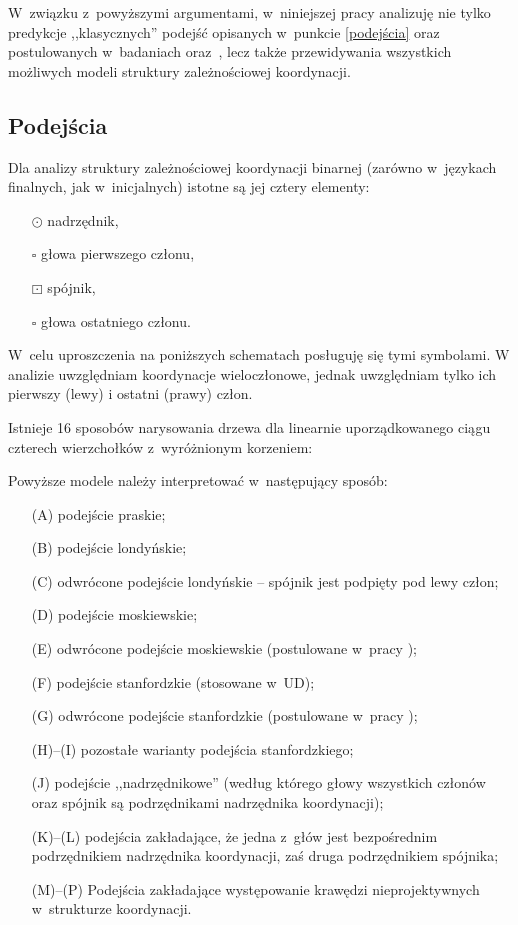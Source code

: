 W~związku z~powyższymi argumentami, w~niniejszej pracy analizuję nie tylko predykcje ,,klasycznych'' podejść opisanych w~punkcie \ref{podejścia} oraz postulowanych w~badaniach \cite{kanayama2018coordinate} oraz~\cite{choi2011statistical}, lecz także przewidywania wszystkich możliwych modeli struktury zależnościowej koordynacji.

\subsection{Podejścia} \label{wszystkie-podejścia}

Dla analizy struktury zależnościowej koordynacji binarnej (zarówno w~językach finalnych, jak w~inicjalnych) istotne są jej cztery elementy: 
\begin{itemize}
\item[$\odot$] nadrzędnik, 
\item[$\square$] głowa pierwszego członu,
\item[$\boxdot$] spójnik, 
\item[$\square$] głowa ostatniego członu. 
\end{itemize}
W~celu uproszczenia na poniższych schematach posługuję się tymi symbolami. W analizie uwzględniam koordynacje wieloczłonowe, jednak uwzględniam tylko ich pierwszy (lewy) i ostatni (prawy) człon.

Istnieje 16 sposobów narysowania drzewa dla linearnie uporządkowanego ciągu czterech wierzchołków z~wyróżnionym korzeniem:



Powyższe modele należy interpretować w~następujący sposób:
\begin{enumerate}
\item[(A)] podejście praskie;
\item[(B)] podejście londyńskie;
\item[(C)] odwrócone podejście londyńskie -- spójnik jest podpięty pod lewy człon;
\item[(D)] podejście moskiewskie;
\item[(E)] odwrócone podejście moskiewskie (postulowane w~pracy \citealp{choi2011statistical});
\item[(F)] podejście stanfordzkie (stosowane w~UD);
\item[(G)] odwrócone podejście stanfordzkie (postulowane w~pracy \citealp{kanayama2018coordinate});
\item[(H)--(I)] pozostałe warianty podejścia stanfordzkiego;
\item[(J)] podejście ,,nadrzędnikowe'' (według którego głowy wszystkich członów oraz spójnik są podrzędnikami nadrzędnika koordynacji);
\item[(K)--(L)] podejścia zakładające, że jedna z~głów jest bezpośrednim podrzędnikiem nadrzędnika koordynacji, zaś druga podrzędnikiem spójnika;
\item[(M)--(P)]  Podejścia zakładające występowanie krawędzi nieprojektywnych w~strukturze koordynacji.
\end{enumerate}

